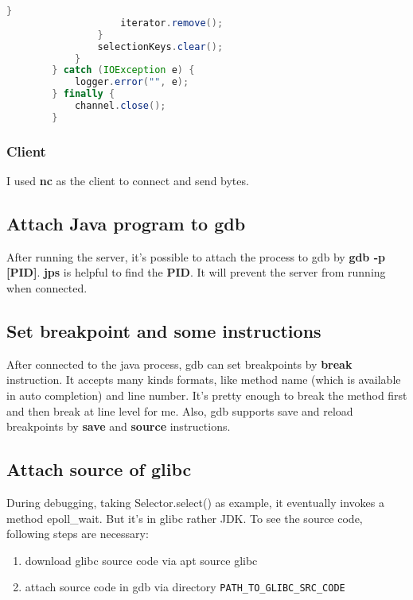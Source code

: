 \documentclass[12pt]{article}
\begin{document}
\begin{lstlisting}[language=Java]
                    }
                    iterator.remove();
                }
                selectionKeys.clear();
            }
        } catch (IOException e) {
            logger.error("", e);
        } finally {
            channel.close();
        }

\end{lstlisting}

\subsubsection*{Client}
I used \textbf{nc} as the client to connect and send bytes.
\subsection{Attach Java program to gdb}
After running the server, it's possible to attach the process to gdb by
\textbf{gdb -p [PID]}. \textbf{jps} is helpful to find the \textbf{PID}. It will prevent the server from running when connected.
\subsection{Set breakpoint and some instructions}
After connected to the java process, gdb can set breakpoints by \textbf{break} instruction. It accepts many kinds formats, like method name (which is available in auto completion) and line number. It's pretty enough to break the method first and then break at line level for me. Also, gdb supports save and reload breakpoints by \textbf{save} and \textbf{source} instructions.

\subsection{Attach source of glibc}
During debugging, taking Selector.select() as example,
it eventually invokes a method epoll\_wait.
But it's in glibc rather JDK.
To see the source code, following steps are necessary:

\begin{enumerate}
    \item download glibc source code via apt source glibc
    \item attach source code in gdb via directory \lstinline{PATH_TO_GLIBC_SRC_CODE}
\end{enumerate}
\end{document}

